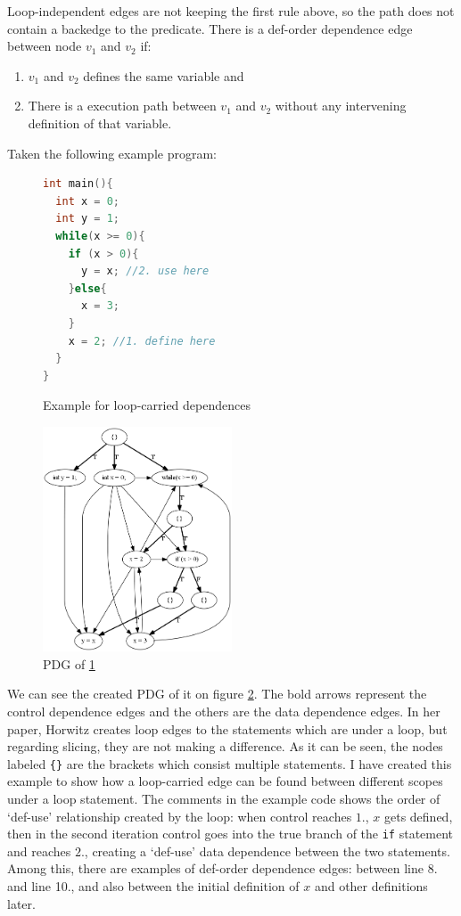 \documentclass[oneside,12pt,a4paper]{book}
\begin{document}
Loop-independent edges are not keeping the first rule above, so the path does not contain a backedge to the predicate.
There is a def-order dependence edge between node $v_1$ and $v_2$ if:
\begin{enumerate}
\item $v_1$ and $v_2$ defines the same variable and
\item There is a execution path between $v_1$ and $v_2$ without any intervening definition of that variable.
\end{enumerate}
\clearpage
Taken the following example program:
\begin{figure}[h]
\lstset{numbers=left}
\begin{lstlisting}[language=C++]
int main(){
  int x = 0;
  int y = 1;
  while(x >= 0){
    if (x > 0){
      y = x; //2. use here
    }else{
      x = 3;
    }
    x = 2; //1. define here
  }
}
\end{lstlisting}
\caption{Example for loop-carried dependences}
\label{fig:example_prog_3}
\end{figure}

\begin{figure}
\includegraphics[width=0.5\textwidth]{loop_carried_test}
\caption{PDG of \ref{fig:example_prog_3}}
\label{fig:example_prog_3_PDG}
\end{figure}
We can see the created PDG of it on figure \ref{fig:example_prog_3_PDG}. The bold arrows represent the control dependence edges and the others are the data dependence edges. In her paper, Horwitz creates loop edges to the statements which are under a loop, but regarding slicing, they are not making a difference. As it can be seen, the nodes labeled \texttt{\{\}} are the brackets which consist multiple statements. I have created this example to show how a loop-carried edge can be found between different scopes under a loop statement. The comments in the example code shows the order of `def-use' relationship created by the loop: when control reaches $1.$, $x$ gets defined, then in the second iteration control goes into the true branch of the \texttt{if} statement and reaches $2.$, creating a `def-use' data dependence between the two statements. Among this, there are examples of def-order dependence edges: between line 8. and line 10., and also between the initial definition of $x$ and other definitions later. 
\end{document}
